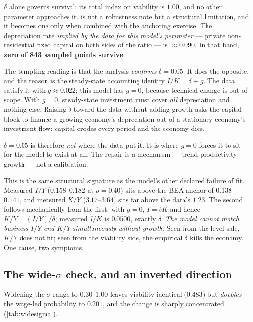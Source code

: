 $\delta$ alone governs survival: its total index on viability is $1.00$, and no
other parameter approaches it.  is not a robustness note but a
structural limitation, and it becomes one only when combined with the anchoring
exercise. The depreciation rate \emph{implied by the data for this model's
perimeter} --- private non-residential fixed capital on both sides of the
ratio --- is $\approx 0.090$. In that band, \textbf{zero of 843 sampled points
survive}.

\begin{declbox}[frametitle={Why this cannot be recalibrated away}]
The tempting reading is that the analysis \emph{confirms} $\delta = 0.05$. It
does the opposite, and the reason is the steady-state accounting identity
$I/K = \delta + g$. The data satisfy it with $g \approx 0.022$; this model has
$g = 0$, because technical change is out of scope. With $g = 0$, steady-state
investment must cover \emph{all} depreciation and nothing else. Raising
$\delta$ toward the data without adding growth asks the capital block to
finance a growing economy's depreciation out of a stationary economy's
investment flow: capital erodes every period and the economy dies.

$\delta = 0.05$ is therefore \emph{not} where the data put it. It is where
$g = 0$ forces it to sit for the model to exist at all. The repair is a
mechanism --- trend productivity growth --- not a calibration.
\end{declbox}

This is the same structural signature as the model's other declared failure of
fit. Measured $I/Y$ ($0.158$--$0.182$ at $\rho = 0.40$) sits above the BEA
anchor of $0.138$--$0.141$, and measured $K/Y$ ($3.17$--$3.64$) sits far above
the data's $1.23$. The second follows mechanically from the first: with
$g = 0$, $I = \delta K$ and hence $K/Y = (I/Y)/\delta$; measured $I/K$ is
$0.0500$, exactly $\delta$. \emph{The model cannot match business $I/Y$ and
$K/Y$ simultaneously without growth.} Seen from the level side, $K/Y$ does not
fit; seen from the viability side, the empirical $\delta$ kills the economy.
One cause, two symptoms.

\subsection{The wide-\texorpdfstring{$\sigma$}{sigma} check, and an inverted
direction}
\label{sec:inversion}

Widening the $\sigma$ range to $0.30$--$1.00$ leaves viability identical
($0.483$) but \emph{doubles} the wage-led probability to $0.201$, and the
change is sharply concentrated (\cref{tab:widesigma}).

